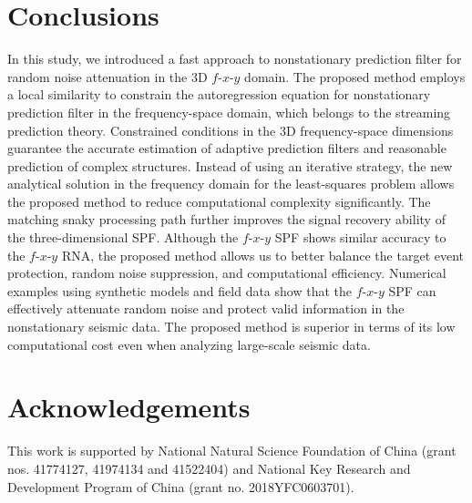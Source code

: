 \section{Conclusions}

In this study, we introduced a fast approach to nonstationary
prediction filter for random noise attenuation in the 3D $f$-$x$-$y$
domain. The proposed method employs a local similarity to constrain
the autoregression equation for nonstationary prediction filter in the
frequency-space domain, which belongs to the streaming prediction
theory. Constrained conditions in the 3D frequency-space dimensions
guarantee the accurate estimation of adaptive prediction filters and
reasonable prediction of complex structures. Instead of using an
iterative strategy, the new analytical solution in the frequency
domain for the least-squares problem allows the proposed method to
reduce computational complexity significantly. The matching snaky
processing path further improves the signal recovery ability of the
three-dimensional SPF. Although the $f$-$x$-$y$ SPF shows similar
accuracy to the $f$-$x$-$y$ RNA, the proposed method allows us to
better balance the target event protection, random noise suppression,
and computational efficiency.  Numerical examples using synthetic
models and field data show that the $f$-$x$-$y$ SPF can effectively
attenuate random noise and protect valid information in the
nonstationary seismic data.  The proposed method is superior in terms
of its low computational cost even when analyzing large-scale seismic
data.

\section{Acknowledgements}
This work is supported by National Natural Science Foundation of China
(grant nos. 41774127, 41974134 and 41522404) and National Key Research
and Development Program of China (grant no. 2018YFC0603701).

\appendix

